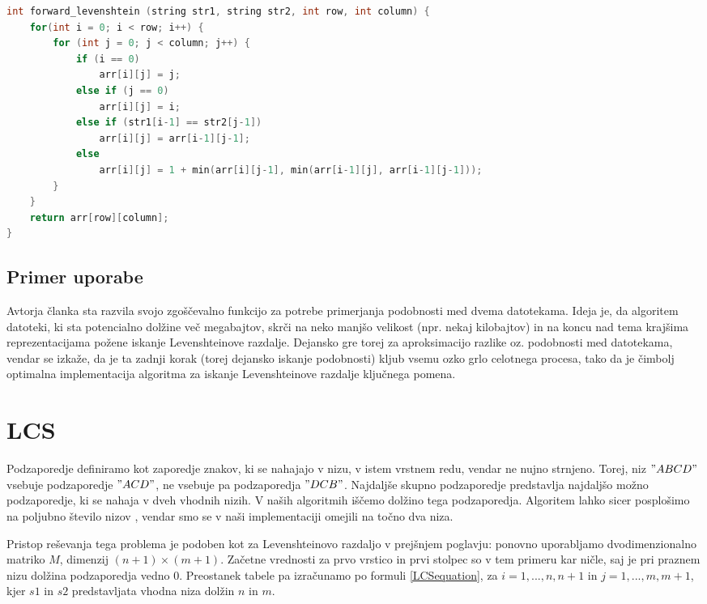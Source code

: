 \documentclass[a4paper,12pt,openright]{book}
\begin{document}
\begin{lstlisting}[language=C++, caption={Algoritem za izračun Levenshteinove razdalje.}, captionpos=b, label=LevenshteinNaprej]
int forward_levenshtein (string str1, string str2, int row, int column) {
    for(int i = 0; i < row; i++) {
        for (int j = 0; j < column; j++) {    
            if (i == 0)
                arr[i][j] = j;
            else if (j == 0)
                arr[i][j] = i;
            else if (str1[i-1] == str2[j-1])
                arr[i][j] = arr[i-1][j-1];
            else 
                arr[i][j] = 1 + min(arr[i][j-1], min(arr[i-1][j], arr[i-1][j-1]));
        }
    }
    return arr[row][column];
}
\end{lstlisting}

\subsection{Primer uporabe}

Avtorja članka \cite{documentsimilarity} sta razvila svojo zgoščevalno funkcijo za potrebe primerjanja podobnosti med dvema datotekama. Ideja je, da algoritem datoteki, ki sta potencialno dolžine več megabajtov, skrči na neko manjšo velikost (npr. nekaj kilobajtov) in na koncu nad tema krajšima reprezentacijama požene iskanje Levenshteinove razdalje. Dejansko gre torej za aproksimacijo razlike oz. podobnosti med datotekama, vendar se izkaže, da je ta zadnji korak (torej dejansko iskanje podobnosti) kljub vsemu ozko grlo celotnega procesa, tako da je čimbolj optimalna implementacija algoritma za iskanje Levenshteinove razdalje ključnega pomena. 

\section{LCS}

Podzaporedje definiramo kot zaporedje znakov, ki se nahajajo v nizu, v istem vrstnem redu, vendar ne nujno strnjeno. Torej, niz $"ABCD"$ vsebuje podzaporedje $"ACD"$, ne vsebuje pa podzaporedja $"DCB"$. Najdaljše skupno podzaporedje predstavlja najdaljšo možno podzaporedje, ki se nahaja v dveh vhodnih nizih. V naših algoritmih iščemo dolžino tega podzaporedja. Algoritem lahko sicer posplošimo na poljubno število nizov \cite{LCSmultipleSequences}, vendar smo se v naši implementaciji omejili na točno dva niza. 

Pristop reševanja tega problema je podoben kot za Levenshteinovo razdaljo v prejšnjem poglavju: ponovno uporabljamo dvodimenzionalno matriko $M$, dimenzij $(n+1) \times (m+1)$. Začetne vrednosti za prvo vrstico in prvi stolpec so v tem primeru kar ničle, saj je pri praznem nizu dolžina podzaporedja vedno 0. Preostanek tabele pa izračunamo po formuli \ref{LCSequation}, za $i=1,...,n,n+1$ in $j=1,...,m,m+1$, kjer $s1$ in $s2$ predstavljata vhodna niza dolžin $n$ in $m$. 
\end{document}
